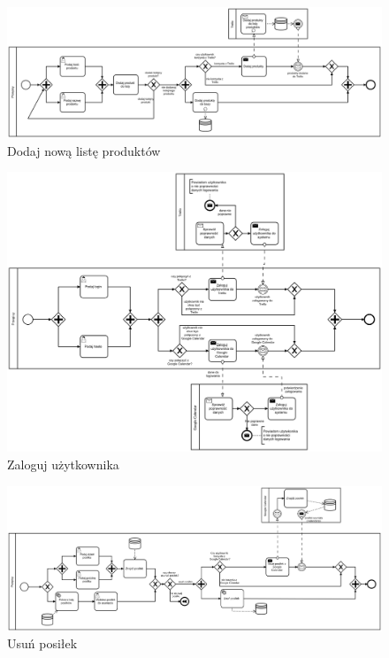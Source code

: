 \documentclass{article}
\begin{document}
\begin{landscape}
\begin{figure}[!ht]
  \centering
    \includegraphics[width=1.5\textwidth]{ok3}\par\vspace{1cm}
  \caption{Dodaj nową listę produktów}
\end{figure}
\end{landscape}
\begin{landscape}

\begin{figure}[!ht]
  \centering
    \includegraphics[width=1.5\textwidth]{ok4}\par\vspace{1cm}
  \caption{Zaloguj użytkownika}
\end{figure}
\end{landscape}
\begin{landscape}

\begin{figure}[!ht]
  \centering
    \includegraphics[width=1.5\textwidth]{ok5}\par\vspace{1cm}
  \caption{Usuń posiłek}
\end{figure}
\end{landscape}
\end{document}
